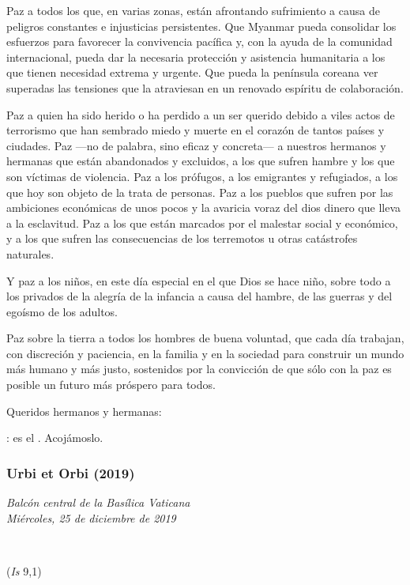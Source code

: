 Paz a todos los que, en varias zonas, están afrontando sufrimiento a causa de peligros constantes e injusticias persistentes. Que Myanmar pueda consolidar los esfuerzos para favorecer la convivencia pacífica y, con la ayuda de la comunidad internacional, pueda dar la necesaria protección y asistencia humanitaria a los que tienen necesidad extrema y urgente. Que pueda la península coreana ver superadas las tensiones que la atraviesan en un renovado espíritu de colaboración.

Paz a quien ha sido herido o ha perdido a un ser querido debido a viles actos de terrorismo que han sembrado miedo y muerte en el corazón de tantos países y ciudades. Paz ---no de palabra, sino eficaz y concreta--- a nuestros hermanos y hermanas que están abandonados y excluidos, a los que sufren hambre y los que son víctimas de violencia. Paz a los prófugos, a los emigrantes y refugiados, a los que hoy son objeto de la trata de personas. Paz a los pueblos que sufren por las ambiciones económicas de unos pocos y la avaricia voraz del dios dinero que lleva a la esclavitud. Paz a los que están marcados por el malestar social y económico, y a los que sufren las consecuencias de los terremotos u otras catástrofes naturales.

Y paz a los niños, en este día especial en el que Dios se hace niño, sobre todo a los privados de la alegría de la infancia a causa del hambre, de las guerras y del egoísmo de los adultos.

Paz sobre la tierra a todos los hombres de buena voluntad, que cada día trabajan, con discreción y paciencia, en la familia y en la sociedad para construir un mundo más humano y más justo, sostenidos por la convicción de que sólo con la paz es posible un futuro más próspero para todos.

Queridos hermanos y hermanas:

: es el . Acojámoslo.

\subsubsection{Urbi et Orbi (2019)} \emph{Balcón central de la Basílica Vaticana\\ Miércoles, 25 de diciembre de 2019}



~

 (\emph{Is} 9,1)

